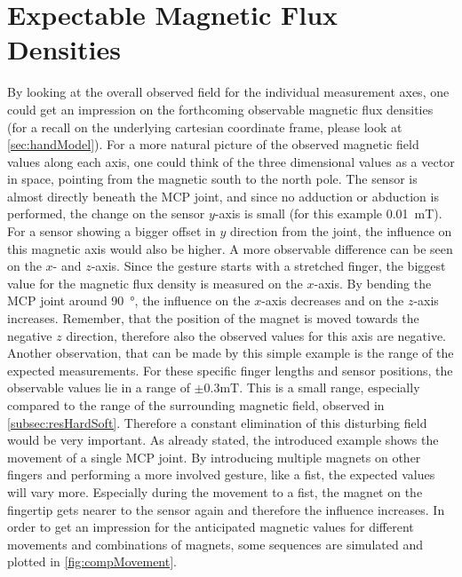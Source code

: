 \FloatBarrier
\section{Expectable Magnetic Flux Densities}

By looking at the overall observed field for the individual measurement axes, one could get an impression on the forthcoming observable magnetic flux densities (for a recall on the underlying cartesian coordinate frame, please look at \ref{sec:handModel}). For a more natural picture of the observed magnetic field values along each axis, one could think of the three dimensional values as a vector in space, pointing from the magnetic south to the north pole. The sensor is almost directly beneath the \ac{MCP} joint, and since no adduction or abduction is performed, the change on the sensor $ y $-axis is small (for this example \SI{0.01}{\milli \tesla}). For a sensor showing a bigger offset in $ y $ direction from the joint, the influence on this magnetic axis would also be higher. A more observable difference can be seen on the $ x $- and $ z $-axis. Since the gesture starts with a stretched finger, the biggest value for the magnetic flux density is measured on the $ x $-axis. By bending the \ac{MCP} joint around \SI{90}{\degree}, the influence on the $ x $-axis decreases and on the $ z $-axis increases. Remember, that the position of the magnet is moved towards the negative $ z $ direction, therefore also the observed values for this axis are negative. Another observation, that can be made by this simple example is the range of the expected measurements. For these specific finger lengths and sensor positions, the observable values lie in a range of $ \pm 0.3\si{\milli \tesla} $. This is a small range, especially compared to the range of the surrounding magnetic field, observed in \ref{subsec:resHardSoft}. Therefore a constant elimination of this disturbing field would be very important. As already stated, the introduced example shows the movement of a single \ac{MCP} joint. By introducing multiple magnets on other fingers and performing a more involved gesture, like a fist, the expected values will vary more. Especially during the movement to a fist, the magnet on the fingertip gets nearer to the sensor again and therefore the influence increases. In order to get an impression for the anticipated magnetic values for different movements and combinations of magnets, some sequences are simulated and plotted in \ref{fig:compMovement}.\\
